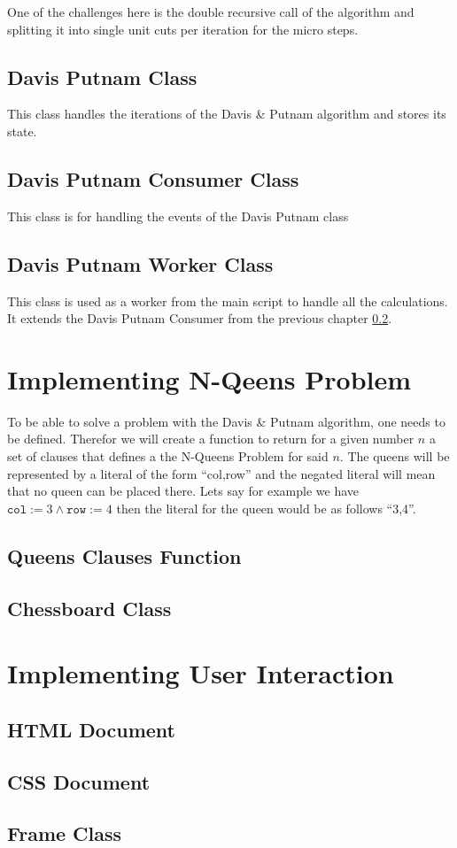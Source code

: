 One of the challenges here is the double recursive call of the algorithm and splitting it into single unit cuts per iteration for the micro steps.

\subsection{Davis Putnam Class}
\label{sub:impDavisPutnam}
This class handles the iterations of the Davis \& Putnam algorithm and stores its state.

\subsection{Davis Putnam Consumer Class}
\label{sub:impDavisPutnamConsumer}
This class is for handling the events of the Davis Putnam class

\subsection{Davis Putnam Worker Class}
\label{sub:impDavisPutnamWorker}
This class is used as a worker from the main script to handle all the calculations. It extends the Davis Putnam Consumer from the previous chapter \ref{sub:impDavisPutnamConsumer}.

\section{Implementing N-Qeens Problem}
\label{sec:impQueens}
To be able to solve a problem with the Davis \& Putnam algorithm, one needs to be defined. Therefor we will create a function to return for a given number $n$ a set of clauses that defines a the N-Queens Problem for said $n$. The queens will be represented by a literal of the form ``col,row'' and the negated literal will mean that no queen can be placed there. Lets say for example we have $\texttt{col} := 3 \land \texttt{row} := 4$ then the literal for the queen would be as follows ``3,4''.

\subsection{Queens Clauses Function}
\label{sub:impQueensClauses}

\subsection{Chessboard Class}
\label{sub:impChessboard}

\section{Implementing User Interaction}
\label{sec:impUI}

\subsection{HTML Document}
\label{sub:impHTML}

\subsection{CSS Document}
\label{sub:impCSS}

\subsection{Frame Class}
\label{sub:impFrame}